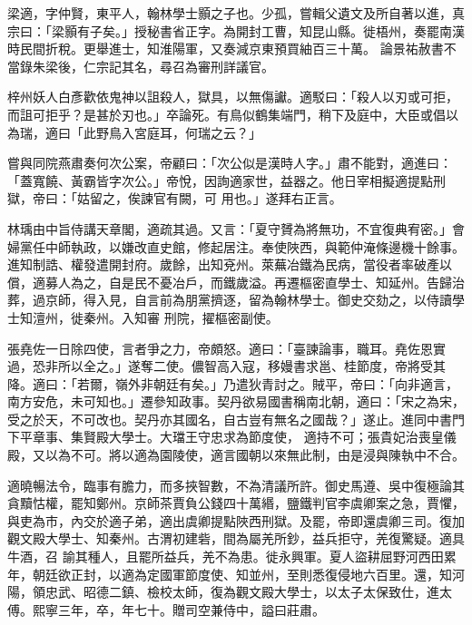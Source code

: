 \begin{pinyinscope}
 梁適，字仲賢，東平人，翰林學士顥之子也。少孤，嘗輯父遺文及所自著以進，真宗曰：「梁顥有子矣。」授秘書省正字。為開封工曹，知昆山縣。徙梧州，奏罷南漢時民間折稅。更舉進士，知淮陽軍，又奏減京東預買紬百三十萬。
 論景祐赦書不當錄朱梁後，仁宗記其名，尋召為審刑詳議官。



 梓州妖人白彥歡依鬼神以詛殺人，獄具，以無傷讞。適駁曰：「殺人以刃或可拒，而詛可拒乎？是甚於刃也。」卒論死。有鳥似鶴集端門，稍下及庭中，大臣或倡以為瑞，適曰「此野鳥入宮庭耳，何瑞之云？」



 嘗與同院燕肅奏何次公案，帝顧曰：「次公似是漢時人字。」肅不能對，適進曰：「蓋寬饒、黃霸皆字次公。」帝悅，因詢適家世，益器之。他日宰相擬適提點刑獄，帝曰：「姑留之，俟諫官有闕，可
 用也。」遂拜右正言。



 林瑀由中旨侍講天章閣，適疏其過。又言：「夏守贇為將無功，不宜復典宥密。」會婦黨任中師執政，以嫌改直史館，修起居注。奉使陜西，與範仲淹條邊機十餘事。進知制誥、權發遣開封府。歲餘，出知兗州。萊蕪冶鐵為民病，當役者率破產以償，適募人為之，自是民不憂冶戶，而鐵歲溢。再遷樞密直學士、知延州。告歸治葬，過京師，得入見，自言前為朋黨擠逐，留為翰林學士。御史交劾之，以侍讀學士知澶州，徙秦州。入知審
 刑院，擢樞密副使。



 張堯佐一日除四使，言者爭之力，帝頗怒。適曰：「臺諫論事，職耳。堯佐恩實過，恐非所以全之。」遂奪二使。儂智高入寇，移嫚書求邕、桂節度，帝將受其降。適曰：「若爾，嶺外非朝廷有矣。」乃遣狄青討之。賊平，帝曰：「向非適言，南方安危，未可知也。」遷參知政事。契丹欲易國書稱南北朝，適曰：「宋之為宋，受之於天，不可改也。契丹亦其國名，自古豈有無名之國哉？」遂止。進同中書門下平章事、集賢殿大學士。大璫王守忠求為節度使，
 適持不可；張貴妃治喪皇儀殿，又以為不可。將以適為園陵使，適言國朝以來無此制，由是浸與陳執中不合。



 適曉暢法令，臨事有膽力，而多挾智數，不為清議所許。御史馬遵、吳中復極論其貪黷怙權，罷知鄭州。京師茶賈負公錢四十萬緡，鹽鐵判官李虞卿案之急，賈懼，與吏為市，內交於適子弟，適出虞卿提點陜西刑獄。及罷，帝即還虞卿三司。復加觀文殿大學士、知秦州。古渭初建砦，間為屬羌所鈔，益兵拒守，羌復驚疑。適具牛酒，召
 諭其種人，且罷所益兵，羌不為患。徙永興軍。夏人盜耕屈野河西田累年，朝廷欲正封，以適為定國軍節度使、知並州，至則悉復侵地六百里。還，知河陽，領忠武、昭德二鎮、檢校太師，復為觀文殿大學士，以太子太保致仕，進太傅。熙寧三年，卒，年七十。贈司空兼侍中，謚曰莊肅。




\end{pinyinscope}
